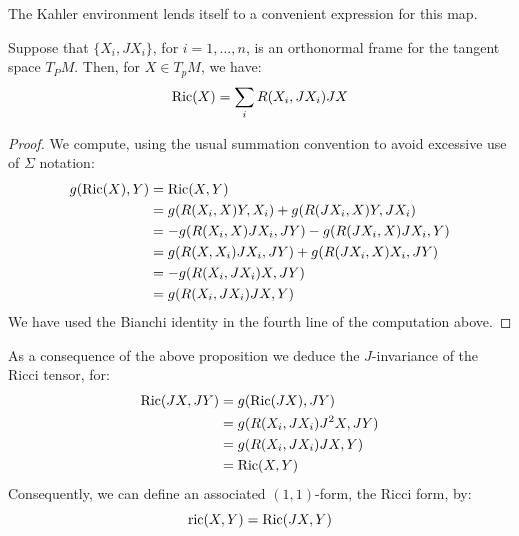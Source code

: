 The Kahler environment lends itself to a convenient expression for this map.
%
\begin{prop} Suppose that $\{X_i, JX_i\}$, for $i=1,\ldots,n$, is an orthonormal frame for the tangent space $T_P M$.  Then, for $X \in T_p M$, we have:
$$ \text{Ric} (X) = \sum_i R(X_i, JX_i) JX $$
\end{prop}
%
\begin{proof}
We compute, using the usual summation convention to avoid excessive use of $\Sigma$ notation:
%
\begin{align*}
g( \text{Ric}(X), Y ) &= \text{Ric}(X,Y) \\
&= g( R ( X_i, X ) Y, X_i ) + g( R ( J X_i, X ) Y, J X_i ) \\
&= - g( R( X_i, X ) J X_i, J Y ) - g( R( J X_i, X )J X_i, Y ) \\
&= g( R( X, X_i ) J X_i, J Y ) + g( R( J X_i, X ) X_i, JY ) \\
&= - g( R( X_i, J X_i ) X, JY ) \\
&= g( R( X_i, J X_i ) JX, Y )
\end{align*}
%
We have used the Bianchi identity in the fourth line of the computation above. 
%
\end{proof}
%
As a consequence of the above proposition we deduce the $J$-invariance of the Ricci tensor, for:
%
\begin{align*}
\text{Ric}( JX, JY ) &= g( \text{Ric}( JX ), JY ) \\
&= g( R( X_i, J X_i ) J^2 X, JY ) \\
&= g( R(X_i, J X_i ) JX, Y ) \\
&= \text{Ric}( X, Y )
\end{align*}
%
Consequently, we can define an associated $(1,1)$-form, the Ricci form, by:
%
$$ \text{ric}(X,Y) = \text{Ric}(JX, Y)$$

